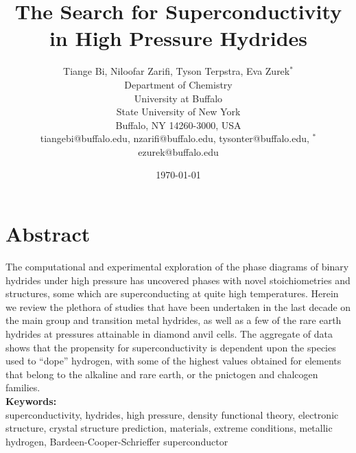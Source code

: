 \documentclass[12pt,letterpaper,oneside]{article}
\begin{document}

\Large
%
  \title{The Search for Superconductivity in High Pressure Hydrides} 
  \normalsize
  \author{Tiange Bi, Niloofar Zarifi, Tyson Terpstra, Eva Zurek$^*$\\
  Department of Chemistry    \\
  University at Buffalo          \\
  State University of New York \\
  Buffalo, NY 14260-3000, USA \\[2ex]
  tiangebi@buffalo.edu, nzarifi@buffalo.edu, tysonter@buffalo.edu, $^*$ezurek@buffalo.edu}
  \date{\today}

\maketitle

\section*{Abstract}
The computational and experimental exploration of the phase diagrams of binary hydrides under high pressure has uncovered phases with novel stoichiometries and structures, some which are superconducting at quite high temperatures. Herein we review the plethora of studies that have been undertaken in the last decade on the main group and transition metal hydrides, as well as a few of the rare earth hydrides at pressures attainable in diamond anvil cells. The aggregate of data shows that the propensity for superconductivity is dependent upon the species used to ``dope'' hydrogen, with some of the highest values obtained for elements that belong to the alkaline and rare earth, or the pnictogen and chalcogen families. \\[2ex]

\noindent\textbf{Keywords:} \\
superconductivity, hydrides, high pressure, density functional theory, electronic structure, crystal structure prediction, materials, extreme conditions, metallic hydrogen, Bardeen-Cooper-Schrieffer superconductor

\newpage
\end{document}
